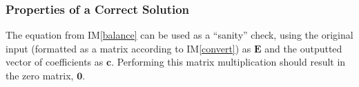 \documentclass[12pt]{article}
\newcommand{\aref}[1]{A\ref{#1}}
\newcommand{\iref}[1]{IM\ref{#1}}
\begin{document}


\subsubsection{Properties of a Correct Solution} \label{sec_PropsCorrSol}

The equation from \iref{balance} can be used as a ``sanity'' check, using the
original input (formatted as a matrix according to \iref{convert}) as
$\textbf{E}$ and the outputted vector of coefficients as $\textbf{c}$.
Performing this matrix multiplication should result in the zero matrix,
$\textbf{0}$.


\end{document}
